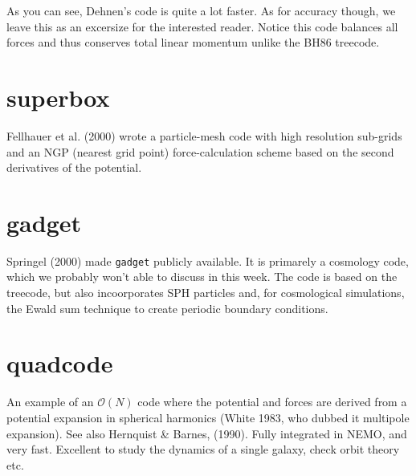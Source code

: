 As you can see, Dehnen's code is quite a lot faster. As for accuracy though, we leave
this as an excersize for the interested reader. Notice this code balances all forces
and thus conserves total linear momentum unlike the BH86 treecode.

\section{superbox}

Fellhauer et al. (2000) wrote a particle-mesh code with high resolution
sub-grids and an NGP (nearest grid point) force-calculation scheme
based on the second derivatives of the potential.

\section{gadget}

Springel (2000) made {\tt gadget} publicly available.
It is primarely a cosmology code, which we probably won't able to discuss in this
week. The code is based on the treecode, but also incoorporates SPH particles
and, for cosmological simulations, the Ewald sum technique to create periodic
boundary conditions.


\section{quadcode}


An example of an $\mathcal{O}(N)$ code where the potential and forces are derived from
a potential expansion in spherical harmonics  (White 1983, who dubbed it multipole expansion). 
See also Hernquist \& Barnes, (1990). Fully integrated
in NEMO, and very fast. Excellent to study the dynamics of a single galaxy,
check orbit theory etc.


